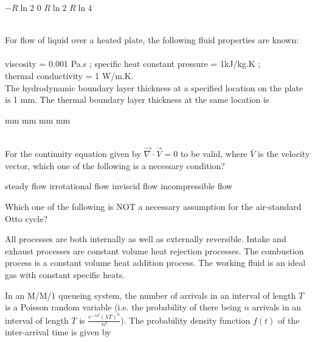 \documentclass[addpoints,11pt]{exam}
\begin{document}
\begin{questions}
    \begin{oneparchoices}
        \choice $-R \ln2$
        \choice $0$
        \choice $R \ln 2$
        \choice $R\ln4$
    \end{oneparchoices}\\

    \question For flow of liquid over a heated plate, the following fluid properties are known:\\\\
    viscosity = 0.001 Pa.s ; specific heat constant pressure = 1kJ/kg.K ;\\
    thermal conductivity = 1 W/m.K.\\
    The hydrodynamic boundary layer thickness at a specified location on the plate is 1 mm. The thermal boundary layer thickness at the same location is
    
    \begin{oneparchoices}
         mm
         mm
         mm
         mm
    \end{oneparchoices}\\

    \question For the continuity equation given by $\overrightarrow{\nabla}\cdot\overrightarrow{V} = 0$ to be valid, where $\bar{V}$ is the velocity vector, which one of the following is a necessary condition?\\

    \begin{choices}
        \choice steady flow
        \choice irrotational flow
        \choice inviscid flow
        \choice incompressible flow
    \end{choices}

    \question Which one of the following is NOT a necessary assumption for the air-standard Otto cycle?\\

    \begin{choices}
        \choice All processes are both internally as well as externally reversible.
        \choice Intake and exhaust processes are constant volume heat rejection processes.
        \choice The combustion process is a constant volume heat addition process.
        \choice The working fluid is an ideal gas with constant specific heats.
    \end{choices}

    \question In an M/M/1 queueing system, the number of arrivals in an interval of length $T$ is a Poisson random variable (i.e. the probability of there being $n$ arrivals in an interval of length $T$ is $\frac{e^{-\lambda T}(\lambda T)^n}{n!}$). The probability density function $f(t)$ of the inter-arrival time is given by\\


\end{questions}
\end{document}
